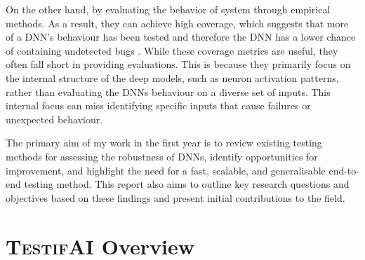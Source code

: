 On the other hand,  by evaluating the behavior of system through empirical methods. As a result, they can achieve high coverage, which suggests that more of a DNN's behaviour has been tested and therefore the DNN has a lower chance of containing undetected bugs \cite{HuangX}. While these coverage metrics are useful, they often fall short in providing \hyperref[gloss]{}\label{comprehensive} evaluations. This is because they primarily focus on the internal structure of the deep models, such as neuron activation patterns, rather than evaluating the DNNs behaviour on a diverse set of inputs. This internal focus can miss identifying specific inputs that cause failures or unexpected behaviour.


\begin{tcolorbox}[colback=purple!2!white, colframe=purple,title= 10\textsuperscript{th} Month Report Goal]

    The primary aim of my work in the first year is to review existing testing methods for assessing the robustness of DNNs, identify opportunities for improvement, and highlight the need for a fast, scalable, and generalisable end-to-end testing method. This report also aims to outline key research questions and objectives based on these findings and present initial contributions to the field.

\end{tcolorbox}



\section{\textsc{TestifAI} Overview}

